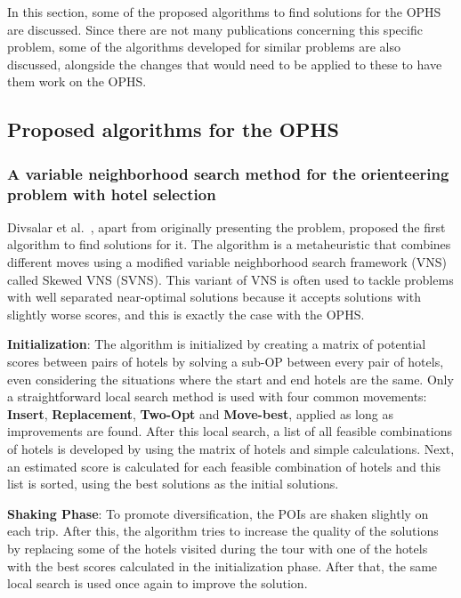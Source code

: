 In this section, some of the proposed algorithms to find solutions for the OPHS are discussed. Since there are not many publications concerning this specific problem, some of the algorithms developed for similar problems are also discussed, alongside the changes that would need to be applied to these to have them work on the OPHS.

\subsection{Proposed algorithms for the OPHS}

\subsubsection{A variable neighborhood search method for the orienteering problem with hotel selection}

    Divsalar et al.~\cite{divsalar2013}, apart from originally presenting the problem, proposed the first algorithm to find solutions for it. The algorithm is a metaheuristic that combines different moves using a modified variable neighborhood search framework (VNS) called Skewed VNS (SVNS). This variant of VNS is often used to tackle problems with well separated near-optimal solutions because it accepts solutions with slightly worse scores, and this is exactly the case with the OPHS.

    \textbf{Initialization}: The algorithm is initialized by creating a matrix of potential scores between pairs of hotels by solving a sub-OP between every pair of hotels, even considering the situations where the start and end hotels are the same. Only a straightforward local search method is used with four common movements: \textbf{Insert}, \textbf{Replacement}, \textbf{Two-Opt} and \textbf{Move-best}, applied as long as improvements are found. After this local search, a list of all feasible combinations of hotels is developed by using the matrix of hotels and simple calculations. Next, an estimated score is calculated for each feasible combination of hotels and this list is sorted, using the best solutions as the initial solutions.

    \textbf{Shaking Phase}: To promote diversification, the POIs are shaken slightly on each trip. After this, the algorithm tries to increase the quality of the solutions by replacing some of the hotels visited during the tour with one of the hotels with the best scores calculated in the initialization phase. After that, the same local search is used once again to improve the solution.

